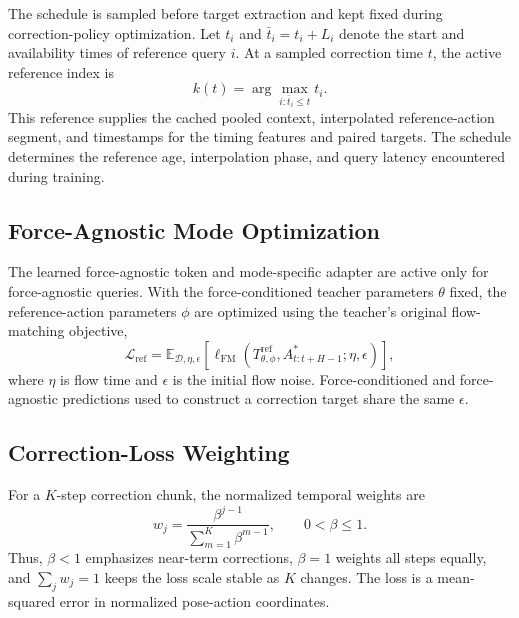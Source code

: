 \documentclass[conference]{IEEEtran}
\begin{document}
The schedule is sampled before target extraction and kept fixed during correction-policy optimization. Let $t_i$ and $\bar t_i=t_i+L_i$ denote the start and availability times of reference query $i$. At a sampled correction time $t$, the active reference index is
\begin{equation}
    k(t)=\arg\max_{i:\bar t_i\leq t}t_i.
    \label{eq:supp_replay_reference}
\end{equation}
This reference supplies the cached pooled context, interpolated reference-action segment, and timestamps for the timing features and paired targets. The schedule determines the reference age, interpolation phase, and query latency encountered during training.

\subsection{Force-Agnostic Mode Optimization}

The learned force-agnostic token and mode-specific adapter are active only for force-agnostic queries. With the force-conditioned teacher parameters $\theta$ fixed, the reference-action parameters $\phi$ are optimized using the teacher's original flow-matching objective,
\begin{equation}
    \mathcal L_{\mathrm{ref}}
    =\mathbb E_{\mathcal D,\eta,\epsilon}
      \!\left[\ell_{\mathrm{FM}}\!\left(
      T_{\theta,\phi}^{\mathrm{ref}},
      A_{t:t+H-1}^*;\eta,\epsilon\right)\right],
    \label{eq:supp_base_training}
\end{equation}
where $\eta$ is flow time and $\epsilon$ is the initial flow noise. Force-conditioned and force-agnostic predictions used to construct a correction target share the same $\epsilon$.

\subsection{Correction-Loss Weighting}

For a $K$-step correction chunk, the normalized temporal weights are
\begin{equation}
    w_j=\frac{\beta^{j-1}}{\sum_{m=1}^{K}\beta^{m-1}},
    \qquad 0<\beta\leq1.
    \label{eq:supp_temporal_weights}
\end{equation}
Thus, $\beta<1$ emphasizes near-term corrections, $\beta=1$ weights all steps equally, and $\sum_jw_j=1$ keeps the loss scale stable as $K$ changes. The loss is a mean-squared error in normalized pose-action coordinates.
\end{document}

